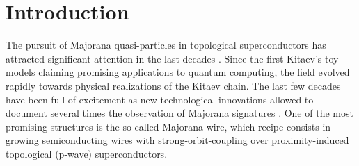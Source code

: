 \documentclass[showpacs,aps,prb,reprint,superscriptaddress]{revtex4-2}
\begin{document}
\begin{abstract}




\end{abstract} 

\maketitle




\maketitle


\section{Introduction}
\label{sec:Intro}


The pursuit of Majorana quasi-particles in topological superconductors has attracted significant attention in the last decades \cite{alicea_new_2012,beenakker_search_2013}.  Since the first Kitaev's toy models \cite{kitaev_unpaired_2001,kitaev_fault-tolerant_2003} claiming promising applications to quantum computing, the field evolved rapidly towards physical realizations of the Kitaev chain.  The last few decades have been full of excitement as new technological innovations  allowed to document several times the observation of Majorana signatures \citep{mourik_signatures_2012,das_zero-bias_2012,deng_anomalous_2012,nadj-perge_observation_2014,deng_majorana_2016,zhang_quantized_2018}. One of the most promising structures is the so-called Majorana wire, which recipe consists in growing semiconducting wires with strong-orbit-coupling over proximity-induced topological (p-wave) superconductors.  
\end{document}
